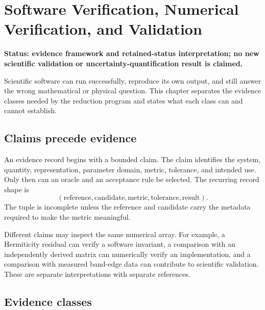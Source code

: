 \chapter{Software Verification, Numerical Verification, and Validation}
\label{ch:verification-and-validation}

\textbf{Status: evidence framework and retained-status interpretation; no new
scientific validation or uncertainty-quantification result is claimed.}

Scientific software can run successfully, reproduce its own output, and still
answer the wrong mathematical or physical question. This chapter separates the
evidence classes needed by the reduction program and states what each class can
and cannot establish.

\section{Claims precede evidence}

An evidence record begins with a bounded claim. The claim identifies the system,
quantity, representation, parameter domain, metric, tolerance, and intended use.
Only then can an oracle and an acceptance rule be selected. The recurring record
shape is
\begin{equation}
  (\text{reference},\text{candidate},\text{metric},
    \text{tolerance},\text{result}).
\end{equation}
The tuple is incomplete unless the reference and candidate carry the metadata
required to make the metric meaningful.

Different claims may inspect the same numerical array. For example, a
Hermiticity residual can verify a software invariant, a comparison with an
independently derived matrix can numerically verify an implementation, and a
comparison with measured band-edge data can contribute to scientific
validation. These are separate interpretations with separate references.

\section{Evidence classes}

